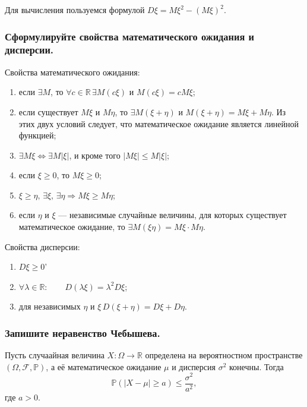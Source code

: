 Для вычисления пользуемся формулой $D \xi = M \xi^2 - \left( M \xi \right)^2.$

\subsubsection*{Сформулируйте свойства математического ожидания и дисперсии.}

Свойства математического ожидания:
\begin{enumerate}
\item если $ \exists M$, то $ \forall c \in \mathbb{R} \, \exists M \left( c \xi \right) $ и $ M \left( c \xi \right) = cM \xi $;
\item если существует $M \xi $ и $M \eta $, то $ \exists M \left( \xi + \eta \right) $ и $M \left( \xi + \eta \right) = M \xi + M \eta $.
Из этих двух условий следует, что математическое ожидание является линейной функцией;
\item $ \exists M \xi \iff \exists M \left| \xi \right| $, и кроме того $ \left| M \xi \right| \leq M \left| \xi \right| $;
\item если $ \xi \geq 0$, то $M \xi \geq 0$;
\item $\xi \geq \eta, \, \exists \xi, \, \exists \eta \Rightarrow M \xi \geq M \eta $;
\item если $ \eta $ и $ \xi $ --- независимые случайные величины,
для которых существует математическое ожидание, то $ \exists M \left( \xi \eta \right) = M \xi \cdot M \eta $.
\end{enumerate}

Свойства дисперсии:
\begin{enumerate}
\item $D \xi \geq 0$'
\item $ \forall \lambda \in \mathbb{R}: \qquad D \left( \lambda \xi \right) = \lambda^2 D \xi $;
\item для независимых $ \eta $ и $ \xi \, D \left( \xi + \eta \right) = D \xi + D \eta $.
\end{enumerate}

\subsubsection*{Запишите неравенство Чебышева.}

Пусть случаайная величина $X: \Omega \rightarrow \mathbb{R}$ определена на вероятностном пространстве
$ \left( \Omega, \mathcal{F}, \mathbb{P} \right) $, а её математическое ожидание $ \mu $ и дисперсия $ \sigma^2$ конечны.
Тогда
$$ \mathbb{P} \left( \left| X - \mu \right| \geq a \right) \leq \frac{ \sigma^2}{a^2},$$
где $a > 0$.


